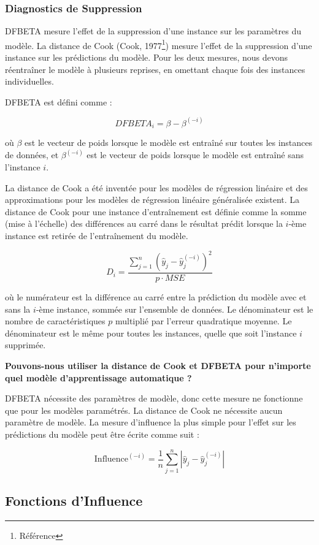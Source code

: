 \subsubsection{Diagnostics de Suppression}

DFBETA mesure l'effet de la suppression d'une instance sur les paramètres du modèle. La distance de Cook (Cook, 1977\footnote{Référence}) mesure l'effet de la suppression d'une instance sur les prédictions du modèle. Pour les deux mesures, nous devons réentraîner le modèle à plusieurs reprises, en omettant chaque fois des instances individuelles.

DFBETA est défini comme :

\[
DFBETA_{i}=\beta-\beta^{(-i)}
\]

où \(\beta\) est le vecteur de poids lorsque le modèle est entraîné sur toutes les instances de données, et \(\beta^{(-i)}\) est le vecteur de poids lorsque le modèle est entraîné sans l'instance \(i\).

La distance de Cook a été inventée pour les modèles de régression linéaire et des approximations pour les modèles de régression linéaire généralisée existent. La distance de Cook pour une instance d'entraînement est définie comme la somme (mise à l'échelle) des différences au carré dans le résultat prédit lorsque la \(i\)-ème instance est retirée de l'entraînement du modèle.

\[
D_i=\frac{\sum_{j=1}^n(\hat{y}_j-\hat{y}_{j}^{(-i)})^2}{p\cdot MSE}
\]

où le numérateur est la différence au carré entre la prédiction du modèle avec et sans la \(i\)-ème instance, sommée sur l'ensemble de données.
Le dénominateur est le nombre de caractéristiques \(p\) multiplié par l'erreur quadratique moyenne.
Le dénominateur est le même pour toutes les instances, quelle que soit l'instance \(i\) supprimée.

\textbf{Pouvons-nous utiliser la distance de Cook et DFBETA pour n'importe quel modèle d'apprentissage automatique ?}

DFBETA nécessite des paramètres de modèle, donc cette mesure ne fonctionne que pour les modèles paramétrés.
La distance de Cook ne nécessite aucun paramètre de modèle.
La mesure d'influence la plus simple pour l'effet sur les prédictions du modèle peut être écrite comme suit :

\[
\text{Influence}^{(-i)}=\frac{1}{n}\sum_{j=1}^{n}\left|\hat{y}_j-\hat{y}_{j}^{(-i)}\right|
\]

\subsection{Fonctions d'Influence}

